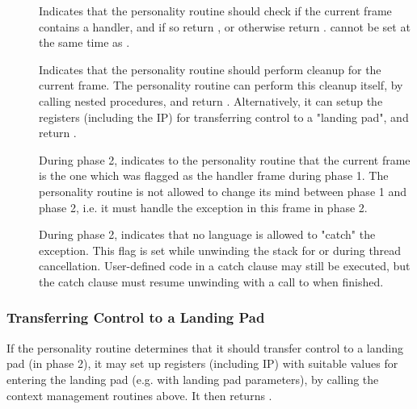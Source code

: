 \begin{description}
\item[] Indicates that the personality routine should
   check if the current frame contains a handler, and if so return
   , or otherwise return .
    cannot be set at the same time as .

\item[]
\begin{sloppypar}
   Indicates that the personality routine should
   perform cleanup for the current frame. The personality routine can perform
   this cleanup itself, by calling nested procedures, and return
   . Alternatively, it can setup the registers
   (including the IP) for transferring control to a "landing pad", and
   return .
\end{sloppypar}

\item[]
   During phase 2, indicates to the personality routine that the current
   frame is the one which was flagged as the handler frame during phase 1.
   The personality routine is not allowed to change its mind between phase 1
   and phase 2, i.e. it must handle the exception in this frame in phase 2.

\item[] During phase 2, indicates that no language is
   allowed to "catch" the exception. This flag is set while unwinding the
   stack for  or during thread cancellation. User-defined code in a
   catch clause may still be executed, but the catch clause must resume
   unwinding with a call to  when finished.
\end{description}

\subsubsection{Transferring Control to a Landing Pad}

If the personality routine determines that it should transfer control to a
landing pad (in phase 2), it may set up registers (including IP) with
suitable values for entering the landing pad (e.g. with landing pad
parameters), by calling the context management routines above. It then
returns .

